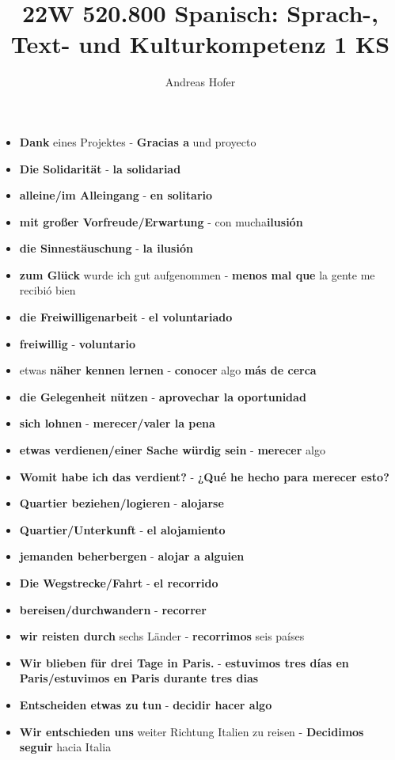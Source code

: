 \documentclass{article}
\title{\vspace{-3cm}22W 520.800 Spanisch: Sprach-, Text- und Kulturkompetenz 1 KS}
\author{Andreas Hofer}
\begin{document}
	\begin{multicols}{2}
	\begin{itemize}
		\item{\textbf{Dank} eines Projektes - \textbf{Gracias a} und proyecto}
		\item{\textbf{Die Solidarität} - \textbf{la solidariad}}
		\item{\textbf{alleine/im Alleingang} - \textbf{en solitario}}
		\item{\textbf{mit großer Vorfreude/Erwartung} - con mucha\textbf{ilusión}}
		\item{\textbf{die Sinnestäuschung} - \textbf{la ilusión}}
		\item{\textbf{zum Glück} wurde ich gut aufgenommen - \textbf{menos mal que} la gente me recibió bien}
		\item{\textbf{die Freiwilligenarbeit} - \textbf{el voluntariado}}
		\item{\textbf{freiwillig} - \textbf{voluntario}}
		\item{etwas \textbf{näher kennen lernen} - \textbf{conocer} algo \textbf{más de cerca}}
		\item{\textbf{die Gelegenheit nützen} - \textbf{aprovechar la oportunidad}}
		\item{\textbf{sich lohnen} - \textbf{merecer/valer la pena}}
		\item{\textbf{etwas verdienen/einer Sache würdig sein} - \textbf{merecer} algo}
		\item{\textbf{Womit habe ich das verdient?} - \textbf{¿Qué he hecho para merecer esto?}}
		\item{\textbf{Quartier beziehen/logieren} - \textbf{alojarse}}
		\item{\textbf{Quartier/Unterkunft} - \textbf{el alojamiento}}
		\item{\textbf{jemanden beherbergen} - \textbf{alojar a alguien}}
		\item{\textbf{Die Wegstrecke/Fahrt} - \textbf{el recorrido}}
		\item{\textbf{bereisen/durchwandern} - \textbf{recorrer}}
		\item{\textbf{wir reisten durch} sechs Länder - \textbf{recorrimos} seis países}
		\item{\textbf{Wir blieben für drei Tage in Paris.} - \textbf{estuvimos tres días en Paris/estuvimos en Paris durante tres dias}}
		\item{\textbf{Entscheiden etwas zu tun} - \textbf{decidir hacer algo}}
		\item{\textbf{Wir entschieden uns} weiter Richtung Italien zu reisen - \textbf{Decidimos seguir} hacia Italia}

\end{itemize}
\end{multicols}
\end{document}
